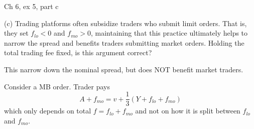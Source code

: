 \documentclass[english,10pt
,aspectratio=169
]{beamer}
\begin{document}
\begin{frame}{Ch 6, ex 5, part c}
	\begin{exampleblock}{}
		(c) Trading platforms often subsidize traders who submit limit orders. That is, they set $f_{lo}<0$ and $f_{mo}>0$, maintaining that this practice ultimately helps to narrow the spread and benefits traders submitting market orders. Holding the total trading fee fixed, is this argument correct?
	\end{exampleblock}
	
	\pause
	
	This  narrow down the nominal spread, but does \alert{NOT} benefit market traders.
	
	Consider a MB order. Trader pays
	\[ A+f_{mo} = v + \frac{1}{3}(Y+f_{lo}+f_{mo}) \]
	which only depends on total $f=f_{lo}+f_{mo}$ and not on how it is split between $f_{lo}$ and $f_{mo}$. 
\end{frame}
\end{document}
